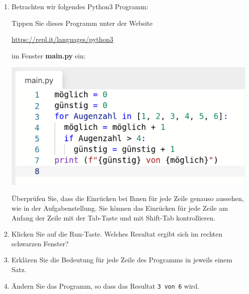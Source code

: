 \documentclass{article}
\begin{document}
\begin{enumerate}
\item Betrachten wir folgendes Python3 Programm:

Tippen Sie dieses Programm unter der Website
\begin{center}\url{https://repl.it/languages/python3}\end{center}
im Fenster \textbf{main.py} ein:
\begin{center}\includegraphics[scale=0.5]{main-py-window}\end{center}
Überprüfen Sie, dass die Einrücken bei Ihnen für jede Zeile genauso aussehen, wie in der Aufgabenstellung.
Sie können das Einrücken für jede Zeile am Anfang der Zeile mit der Tab-Taste und mit Shift-Tab kontrollieren.

\item Klicken Sie auf die Run-Taste. Welches Resultat ergibt sich im rechten schwarzen Fenster?

\item Erklären Sie die Bedeutung für jede Zeile des Programms in jeweils einem Satz.

\item Ändern Sie das Programm, so dass das Resultat \texttt{3 von 6} wird.
\end{enumerate}
\end{document}
